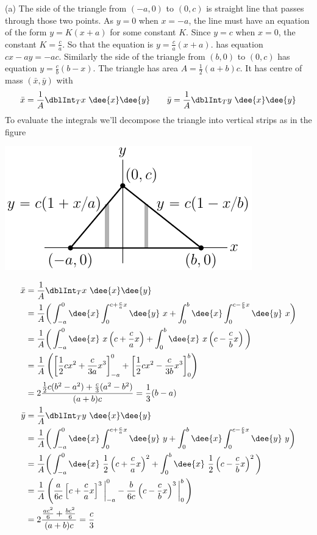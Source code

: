 \begin{solution}
(a) The side of the triangle from $(-a,0)$ to $(0,c)$ is straight line that passes through those two points. As $y=0$ when $x=-a$, the line must have 
an equation of the form $y=K(x+a)$ for some constant $K$. Since $y=c$ when
$x=0$, the constant $K=\frac{c}{a}$. So that the equation is 
$y=\frac{c}{a}(x+a)$.
has equation $cx-ay=-ac$. Similarly the side of the triangle from 
$(b,0)$ to $(0,c)$ has equation $y=\frac{c}{b}(b-x)$. 
The triangle has area $A=\frac{1}{2}(a+b)c$. It has centre
of mass $(\bar x,\bar y)$ with
\begin{align*}
\bar x=\frac{1}{A}\dblInt_T x\ \dee{x}\dee{y}\qquad
\bar y=\frac{1}{A}\dblInt_T y\ \dee{x}\dee{y}
\end{align*}
To evaluate the integrals we'll decompose the triangle into vertical strips
as in the figure
\begin{center}
     \includegraphics{fig/OE03AQ6a.pdf}
\end{center}
\begin{align*}
\bar x&=\frac{1}{A}\dblInt_T x\ \dee{x}\dee{y} \\
&=\frac{1}{A}\bigg(\int_{-a}^0 \dee{x}\int_0^{c+{c\over a}x}\dee{y}\ x
                   +\int_0^b \dee{x}\int_0^{c-{c\over b}x}\dee{y}\ x\bigg)\\
&=\frac{1}{A}\bigg(\int_{-a}^0 \dee{x}\ x\left(c+\frac{c}{a}x\right)
                   +\int_0^b \dee{x}\ x\left(c-\frac{c}{b}x\right)\bigg)\\
&=\frac{1}{A}\left(\left[\frac{1}{2} cx^2+\frac{c}{3a}x^3\right]_{-a}^0 
                   +\left[\frac{1}{2} cx^2-\frac{c}{3b}x^3\right]_0^b\right) \\
&=2\frac{\frac{1}{2} c(b^2-a^2)+\frac{c}{3}(a^2-b^2)}{(a+b)c}
=\frac{1}{3}(b-a)\\
\bar y&=\frac{1}{A}\dblInt_T y\ \dee{x}\dee{y} \\
&=\frac{1}{A}\bigg(\int_{-a}^0 \dee{x}\int_0^{c+{c\over a}x}\dee{y}\ y
                   +\int_0^b \dee{x}\int_0^{c-{c\over b}x}\dee{y}\ y\bigg)\\
&=\frac{1}{A}\bigg(\int_{-a}^0 \dee{x}\ \frac{1}{2}\left(c+\frac{c}{a}x\right)^2
                   +\int_0^b \dee{x}\ \frac{1}{2}\left(c-\frac{c}{b}x\right)^2\bigg)\\
&=\frac{1}{A}\left(\frac{a}{6c}\left[c+\frac{c}{a}x\right]^3\bigg|_{-a}^0 
                   -\frac{b}{6c}\left(c-\frac{c}{b}x\right)^3\bigg|_0^b\,
               \right) \\
&=2\frac{\frac{ac^2}{6}+\frac{bc^2}{6}}{(a+b)c}
=\frac{c}{3}
\end{align*}


\end{solution}
